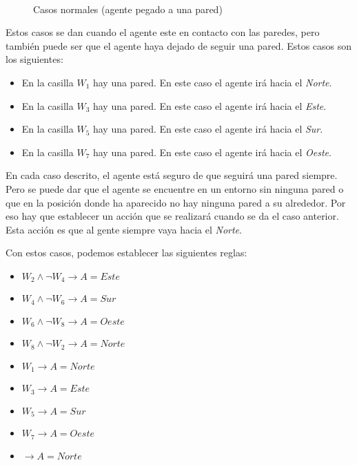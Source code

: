 \begin{figure}[htb]
\centering
  \hspace{1em}
  \\
  \hspace{1em}
  \caption{Casos normales (agente pegado a una pared)}\label{fig:seguir_pared}
\end{figure}

\FloatBarrier

Estos casos se dan cuando el agente este en contacto con las paredes, pero también puede ser que el agente haya dejado de seguir una pared. Estos casos son los siguientes:

\begin{itemize}
    \item En la casilla \emph{$W_{1}$} hay una pared. En este caso el agente irá hacia el \emph{Norte}.
    \item En la casilla \emph{$W_{3}$} hay una pared. En este caso el agente irá hacia el \emph{Este}.
    \item En la casilla \emph{$W_{5}$} hay una pared. En este caso el agente irá hacia el \emph{Sur}.
    \item En la casilla \emph{$W_{7}$} hay una pared. En este caso el agente irá hacia el \emph{Oeste}.
\end{itemize}

En cada caso descrito, el agente está seguro de que seguirá una pared siempre. Pero se puede dar que el agente se encuentre en un entorno sin ninguna pared o que en la posición donde ha aparecido no hay ninguna pared a su alrededor. Por eso hay que establecer un acción que se realizará cuando se da el caso anterior. Esta acción es que al gente siempre vaya hacia el \emph{Norte}.

Con estos casos, podemos establecer las siguientes reglas:

\begin{itemize}
    \item \emph{$W_{2} \land \neg W_{4} \longrightarrow A = Este$}
    \item \emph{$W_{4} \land \neg W_{6} \longrightarrow A = Sur$}
    \item \emph{$W_{6} \land \neg W_{8} \longrightarrow A = Oeste$}
    \item \emph{$W_{8} \land \neg W_{2} \longrightarrow A = Norte$}
    \item \emph{$W_{1} \longrightarrow A = Norte$}
    \item \emph{$W_{3} \longrightarrow A = Este$}
    \item \emph{$W_{5} \longrightarrow A = Sur$}
    \item \emph{$W_{7} \longrightarrow A = Oeste$}
    \item \emph{$\longrightarrow A = Norte$}
\end{itemize}

